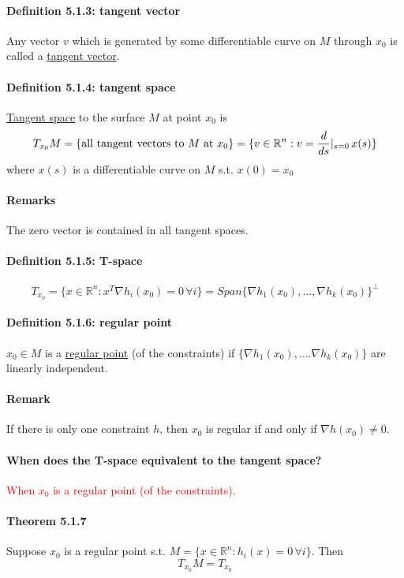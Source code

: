 \documentclass[11pt]{article}
\newcommand{\real}[0]{\mathbb{R}}
\newcommand{\under}[1]{\underline{#1}}
\begin{document}
\paragraph{Definition 5.1.3: tangent vector}
Any vector $v$ which is generated by some differentiable curve on $M$ through $x_0$ is called a \under{tangent vector}.

\paragraph{Definition 5.1.4: tangent space}
\under{Tangent space} to the surface $M$ at point $x_0$ is
$$T_{x_0} M = \{ \text{all tangent vectors to $M$ at $x_0$} \} \\
= \{v \in \real^n: v = \frac{d}{ds} |_{s=0} \, x(s)\}$$
where $x(s)$ is a differentiable curve on $M$ s.t. $x(0) = x_0$

\paragraph{Remarks}
The zero vector is contained in all tangent spaces.

\paragraph{Definition 5.1.5: T-space}
$$T_{x_0} = \{ x\in \real^n: x^T \nabla h_i(x_0) = 0 \, \forall i\} = Span\{ \nabla h_1(x_0), \hdots, \nabla h_k(x_0)\}^\perp$$

\paragraph{Definition 5.1.6: regular point}
$x_0 \in M$ is a \under{regular point} (of the constraints) if $\{ \nabla h_1(x_0), \hdots. \nabla h_k(x_0) \}$ are linearly independent.
\paragraph{Remark}
If there is only one constraint $h$, then $x_0$ is regular if and only if $\nabla h(x_0) \neq 0$.

\paragraph{When does the T-space equivalent to the tangent space?}
\textcolor{red}{When $x_0$ is a regular point (of the constraints).}

\paragraph{Theorem 5.1.7}
Suppose $x_0$ is a regular point s.t. $ M = \{ x \in \real^n: h_i(x) = 0 \, \forall i\}$. Then
$$T_{x_0}M = T_{x_0}$$
\end{document}
